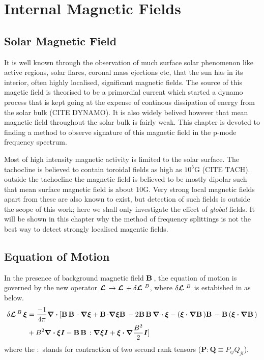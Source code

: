\chapter{Internal Magnetic Fields}

\section{Solar Magnetic Field}\label{mag_intro}

It is well known through the observation of much surface solar phenomenon like active regions, solar flares, coronal mass ejections etc, that the sun has in its interior, often highly localised, significant magnetic fields. The source of this magetic field is theorised to be a primordial current which started a dynamo process that is kept going at the expense of continous dissipation of energy from the solar bulk (CITE DYNAMO). It is also widely belived however that mean magnetic field throughout the solar bulk is fairly weak. This chapter is devoted to finding a method to observe signature of this magnetic field in the p-mode frequency spectrum.

Most of high intensity magnetic activity is limited to the solar surface. The tachocline is believed to contain toroidal fields as high as $10^5 \text{G}$ (CITE TACH). outside the tachocline the magnetic field is believed to be mostly dipolar such that mean surface magnetic field is about $10\text{G}$. Very strong local magnetic fields apart from these are also known to exist, but detection of such fields is outside the scope of this work; here we shall only investigate the effect of \textit{global} fields. It will be shown in this chapter why the method of frequency splittings is not the best way to detect strongly localised magentic fields.

\section{Equation of Motion}

In the presence of background magnetic field $\mathbf{B}\,$, the equation of motion is governed by the new operator $\bm{\mathcal{L}}\, \rightarrow \bm{\mathcal{L}}\, + \delta \bm{\mathcal{L}}\,\,^{B}$, where $\delta \bm{\mathcal{L}}\,\,^B$ is estabished in \cite{hanasoge17} as below.
\begin{align}
    \delta \bm{\mathcal{L}}\,^{B}\, \boldsymbol{\xi} &= \frac{-1}{4\pi}\boldsymbol{\nabla \cdot} [\mathbf{B}\,\mathbf{B}\,\cdot \boldsymbol{\nabla} \boldsymbol{\xi} + \mathbf{B}\, {\cdot} \boldsymbol{\nabla}\boldsymbol{\xi}\mathbf{B}\, - 2 \mathbf{B}\,\mathbf{B}\,\boldsymbol{\nabla \cdot}\boldsymbol{\xi} - (\boldsymbol{\xi \cdot \nabla} \mathbf{B}\,)\mathbf{B}\, - \mathbf{B}\,(\boldsymbol{\xi \cdot \nabla}\mathbf{B}\,)\notag
    \\& + B^2 \boldsymbol{\nabla \cdot \xi I} - \mathbf{B}\,\mathbf{B}\, :\boldsymbol{\nabla \xi I} + \boldsymbol{\xi \cdot \nabla}\frac{B^2}{2}\boldsymbol{I}] 
     \label{eqn:dLB}
\end{align}
where the $:$ stands for contraction of two second rank tensors ($\mathbf{P}:\mathbf{Q} \equiv P_{ij}Q_{ji} $).

